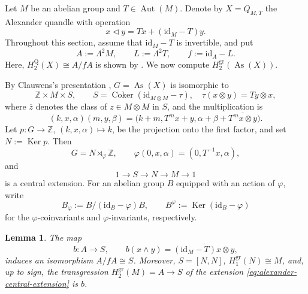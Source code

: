 \documentclass[11pt]{article}
\newtheorem{lemma}[theorem]{Lemma}
\DeclareMathOperator{\As}{As}
\DeclareMathOperator{\Ker}{Ker}
\DeclareMathOperator{\Coker}{Coker}
\newcommand{\ZZ}{\mathbb Z}
\newcommand{\gr}{\mathrm{gr}}
\newcommand{\Q}{\mathrm Q}
\begin{document}
Let $M$ be an abelian group and $T\in\operatorname{Aut}(M)$. Denote by
$X=Q_{M,T}$ the Alexander quandle with operation
\[
 x\lhd y=Tx+(\mathrm{id}_M-T)y.
\]
Throughout this section, assume that $\mathrm{id}_M-T$ is invertible, and put
\[
 A:=\Lambda^2M,
 \qquad
 L:=\Lambda^2T,
 \qquad
 f:=\mathrm{id}_A-L.
\]
Here, $H_2^\Q(X)\cong A/fA$ is shown by \cite[Corollary~4.3]{BIMNP}. We now compute
$H_2^{\gr}(\As(X))$.

By Clauwens's presentation \cite[Theorem~1]{ClauwensAlexander},
$G=\As(X)$ is isomorphic to
\[
        \ZZ\times M\times S,
        \qquad
        S=\Coker(\mathrm{id}_{M\otimes M}-\tau),
        \quad \tau(x\otimes y)=Ty\otimes x,
\]
where $\overline z$ denotes the class of $z\in M\otimes M$ in $S$, and the
multiplication is
\[
(k,x,\alpha)(m,y,\beta)
 =
 \bigl(k+m,T^m x+y,
 \alpha+\beta+\overline{T^m x\otimes y}\bigr).
\]
Let
$p\colon G\to\ZZ$, $(k,x,\alpha)\mapsto k$, be the projection onto the first
factor, and set $N:=\Ker p$. Then
\[
G=N\rtimes_\varphi\ZZ,
        \qquad
        \varphi(0,x,\alpha)=(0,T^{-1}x,\alpha),
\]
and
\begin{equation}
        1\longrightarrow S\longrightarrow N\longrightarrow M\longrightarrow1
\label{eq:alexander-central-extension}
\end{equation}
is a central extension. For an abelian group $B$ equipped with an action of
$\varphi$, write
\[
 B_\varphi:=B/(\mathrm{id}_B-\varphi)B,
 \qquad
 B^\varphi:=\Ker(\mathrm{id}_B-\varphi)
\]
for the $\varphi$-coinvariants and $\varphi$-invariants, respectively.

\begin{lemma}
\label{lem:alexander-extension}
The map
\[
 b\colon A\longrightarrow S,
 \qquad
 b(x\wedge y)=\overline{(\mathrm{id}_M-T)x\otimes y},
\]
induces an isomorphism $A/fA\cong S$. Moreover,
$S=[N,N]$, $H_1^{\gr}(N)\cong M$, and, up to sign, the transgression
$H_2^{\gr}(M)=A\to S$ of the extension
\eqref{eq:alexander-central-extension} is $b$.
\end{lemma}
\end{document}
